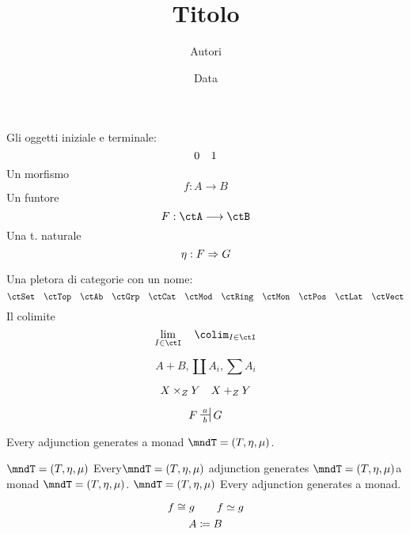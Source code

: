 \documentclass[ paper=a4
              , pagesize
              , fontsize=12pt
              , twoside=true
              , BCOR=5mm
              , DIV=calc
              , bibliography=totoc
              , final
              , version=last
              ]{scrbook}
\begin{document}
\frontmatter

\title{Titolo}
\author{Autori}
\date{Data}
\publishers{Casa editrice}
\uppertitleback{Dettagli pubblicazione I}
\lowertitleback{Dettagli pubblicazione II}
\dedication{Dedica}

\maketitle

\tableofcontents

\mainmatter


\chapter{}
Gli oggetti iniziale e terminale:
\[\init\quad\term\]
Un morfismo
\[f : A \to B\]
Un funtore
\[F : \ctA \fun \ctB\]
Una t. naturale
\[\eta : F \nat G\]

Una pletora di categorie con un nome:
\[
	\ctSet\quad
	\ctTop\quad
	\ctAb\quad
	\ctGrp\quad
	\ctCat\quad
	\ctMod\quad
	\ctRing\quad
	\ctMon\quad
	\ctPos\quad
	\ctLat\quad
	\ctVect\]
Il colimite
\[\lim_{I\in\ctI} \quad \colim_{I\in\ctI}\]


\[A + B, \coprod A_i, \sum A_i\]

\[\pull{X}{Y}{Z} \quad \push{X}{Y}{Z}\]

\[F\adjunct[a][b] G\]

Every adjunction generates a monad \(\mndT = (T, \eta,\mu)\).

\(\mndT = (T, \eta,\mu)\) Every\(\mndT = (T, \eta,\mu)\) adjunction generates \(\mndT = (T, \eta,\mu)\)a monad \(\mndT = (T, \eta,\mu)\).
\(\mndT = (T, \eta,\mu)\) Every adjunction generates a monad.

\[f \iso g\qquad f \eqv g\]
\[A \defeq B\]
\clearpage
\appendix

\backmatter
\end{document}
